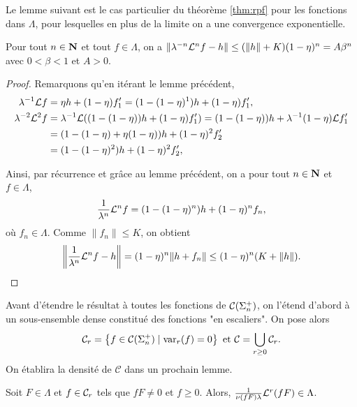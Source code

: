   Le lemme suivant est le cas particulier du théorème \ref{thm:rpf} pour les fonctions dans $\Lambda$, pour lesquelles en plus de la limite
  on a une convergence exponentielle.

  \begin{lemma}
    \label{lem:conv_expo}
    Pour tout $n \in \mathbf N$ et tout $f\in\Lambda$, on a $\left\lVert \lambda^{-n}\mathcal{L}^nf - h\right\rVert \leq (\lVert h\rVert + K)(1 - \eta)^n = A\beta^n$
    avec $0 < \beta < 1$ et $A > 0$.
  \end{lemma}

  \begin{proof}
    Remarquons qu'en itérant le lemme précédent,
    \begin{align*}
      \lambda^{-1}\L f   &= \eta h + (1 - \eta)f'_1 = (1 - (1 - \eta)^1)h + (1 - \eta)f_1', \vspace{1em}\\
      \lambda^{-2}\L^2 f &= \lambda^{-1}\L((1 - (1 - \eta))h + (1 - \eta)f'_1) = (1 - (1 - \eta))h + \lambda^{-1}(1 - \eta)\L f'_1 \\
			 &= (1 - (1 - \eta) + \eta(1 - \eta))h + (1 - \eta)^2f'_2 \\
		         &= (1 - (1 - \eta)^2)h + (1 - \eta)^2f'_2,
    \end{align*}

    Ainsi, par récurrence et grâce au lemme précédent, on a pour tout $n \in \mathbf N$ et $f \in \Lambda$,
    $$\frac 1 {\lambda^n}\mathcal{L}^n f = (1 - (1 - \eta)^n)h + (1 - \eta)^nf_n,$$
    où $f_n \in \Lambda$. Comme $\lVert f_n\rVert \leq K$, on obtient
    $$\left\lVert \frac 1 {\lambda^n}\mathcal{L}^n f - h\right\rVert = (1-\eta)^n\lVert h + f_n\rVert \leq (1-\eta)^n(K + \lVert h\rVert).$$
  \end{proof}

  Avant d'étendre le résultat à toutes les fonctions de $\mathcal{C} (\Sigma_{n}^+)$, on l'étend d'abord à un sous-ensemble dense
  constitué des fonctions "en escaliers".
  On pose alors
  $$\mathcal C_{r} = \left\{f \in \mathcal{C} (\Sigma_{n}^+) \mid \operatorname{var}_r(f) = 0 \right\} \text{ et } \mathcal C = \bigcup_{r\geq 0}{\mathcal C_{r}}.$$
  On établira la densité de $\mathcal C$ dans un prochain lemme.

  \begin{lemma}
    \label{lem:Lambda_stb_mult_Cr}
    Soit $F \in \Lambda$ et $f \in \mathcal C_{r}$ tels que $fF\not= 0$ et $f \geq 0$.
    Alors, $\frac{1}{\nu(fF)\lambda}\mathcal{L}^r(fF) \in \Lambda$.
  \end{lemma}

